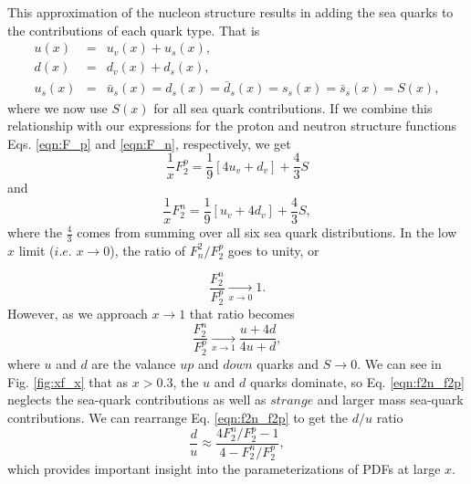 This approximation of the nucleon structure results in adding the sea quarks to the contributions of each quark type. That is
\begin{eqnarray}
\nonumber
u(x) &=& u_v(x) + u_s(x), \\
\nonumber
d(x) &=& d_v(x) + d_s(x), \\
u_s(x) &=& \bar{u}_s(x) = d_s(x) = \bar{d}_s(x) = s_s(x) = \bar{s}_s(x) = S(x),
\end{eqnarray}
where we now use $S(x)$ for all sea quark contributions. If we combine this relationship with our expressions for the proton and neutron structure functions Eqs. \ref{eqn:F_p} and \ref{eqn:F_n}, respectively, we get
\begin{equation}
\frac{1}{x} F_2^p = \frac{1}{9}[4u_v + d_v] + \frac{4}{3} S
\end{equation}
and 
\begin{equation}
\frac{1}{x} F_2^n = \frac{1}{9}[u_v + 4d_v] + \frac{4}{3} S,
\end{equation}
where the $\tfrac{4}{3}$ comes from summing over all six sea quark distributions. In the low $x$ limit ($i.e.$ $x \rightarrow 0$), the ratio of $F_n^2/F_2^p$ goes to unity, or

\begin{equation}
\frac{F_2^n}{F_2^p} \xrightarrow[\text{$x \rightarrow 0$}]{} 1.
\end{equation}
However, as we approach $x \rightarrow 1$ that ratio becomes
\begin{equation}
\label{eqn:f2n_f2p}
\frac{F_2^n}{F_2^p} \xrightarrow[\text{$x \rightarrow 1$}]{} \frac{u+4d}{4u+d},
\end{equation}
where $u$ and $d$ are the valance $up$ and $down$ quarks and $S\rightarrow0$. We can see in Fig. \ref{fig:xf_x} that as $x>0.3$, the $u$ and $d$ quarks dominate, so Eq. \ref{eqn:f2n_f2p} neglects the sea-quark contributions as well as $strange$ and larger mass sea-quark contributions. We can rearrange Eq. \ref{eqn:f2n_f2p} to get the $d/u$ ratio
\begin{equation}
\label{eqn:d/u}
\frac{d}{u} \approx \frac{4F_2^n/F_2^p-1}{4 - F_2^n/F_2^p},
\end{equation}
which provides important insight into the parameterizations of PDFs at large $x$.

